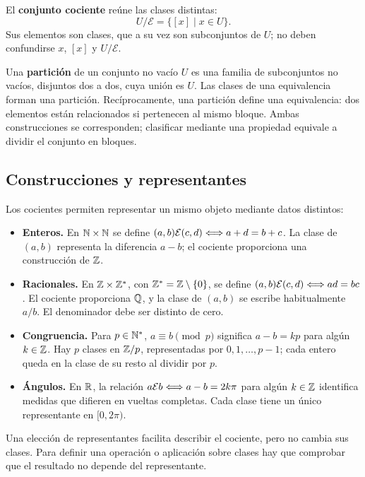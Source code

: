 \begin{samepage}
El \textbf{conjunto cociente} reúne las clases distintas:
\[
 U/\mathcal E=\{[x]\mid x\in U\}.
\]
Sus elementos son clases, que a su vez son subconjuntos de $U$;
no deben confundirse $x$, $[x]$ y $U/\mathcal E$.
\end{samepage}

Una \textbf{partición} de un conjunto no vacío $U$ es una familia
de subconjuntos no vacíos, disjuntos dos a dos, cuya unión es $U$.
Las clases de una equivalencia forman una partición. Recíprocamente,
una partición define una equivalencia: dos elementos están relacionados
si pertenecen al mismo bloque. Ambas construcciones se corresponden;
clasificar mediante una propiedad equivale a dividir el conjunto en bloques.

\subsection*{Construcciones y representantes}

Los cocientes permiten representar un mismo objeto mediante datos distintos:
\begin{itemize}
 \item \textbf{Enteros.} En $\mathbb{N}\times\mathbb{N}$ se define
       $(a,b)\mathcal E(c,d)\Longleftrightarrow a+d=b+c$.
       La clase de $(a,b)$ representa la diferencia $a-b$;
       el cociente proporciona una construcción de $\mathbb{Z}$.
 \item \textbf{Racionales.} En $\mathbb{Z}\times\mathbb{Z}^*$, con
       $\mathbb{Z}^*=\mathbb{Z}\setminus\{0\}$, se define
       $(a,b)\mathcal E(c,d)\Longleftrightarrow ad=bc$.
       El cociente proporciona $\mathbb{Q}$, y la clase de $(a,b)$ se escribe
       habitualmente $a/b$. El denominador debe ser distinto de cero.
 \item \textbf{Congruencia.} Para $p\in\mathbb{N}^*$,
       $a\equiv b\pmod p$ significa $a-b=kp$ para algún $k\in\mathbb{Z}$.
       Hay $p$ clases en $\mathbb{Z}/p$, representadas por $0,1,\ldots,p-1$;
       cada entero queda en la clase de su resto al dividir por $p$.
 \item \textbf{Ángulos.} En $\mathbb{R}$, la relación
       $a\mathcal E b\Longleftrightarrow a-b=2k\pi$ para algún $k\in\mathbb{Z}$
       identifica medidas que difieren en vueltas completas.
       Cada clase tiene un único representante en $[0,2\pi)$.
\end{itemize}
Una elección de representantes facilita describir el cociente, pero
no cambia sus clases. Para definir una operación o aplicación sobre
clases hay que comprobar que el resultado no depende del representante.

